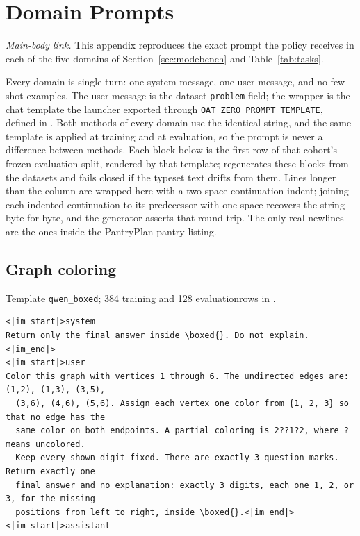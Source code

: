 \clearpage
\section{Domain Prompts}
\label{app:prompts}

\noindent\emph{Main-body link.} This appendix reproduces the exact prompt the
policy receives in each of the five \mb{} domains of
Section~\ref{sec:modebench} and Table~\ref{tab:tasks}.

Every domain is single-turn: one system message, one user message, and no
few-shot examples. The user message is the dataset \texttt{problem} field; the
wrapper is the chat template the launcher exported through
\texttt{OAT\_ZERO\_PROMPT\_TEMPLATE}, defined in
. Both methods of every domain use the identical
string, and the same template is applied at training and at evaluation, so the
prompt is never a difference between methods. Each block below is the first row of
that cohort's frozen evaluation split, rendered by that template;
 regenerates these blocks from the
datasets and fails closed if the typeset text drifts from them. Lines longer
than the column are wrapped here with a two-space continuation indent; joining
each indented continuation to its predecessor with one space recovers the
string byte for byte, and the generator asserts that round trip. The only real
newlines are the ones inside the PantryPlan pantry listing.


\subsection{Graph coloring}
\label{app:prompt-graph}

\noindent Template \texttt{qwen\_boxed}; 384 training and 128 evaluation\linebreak rows in .

\begin{Verbatim}[fontsize=\scriptsize,frame=single,framesep=4pt,rulecolor=\color{black!25}]
<|im_start|>system
Return only the final answer inside \boxed{}. Do not explain.<|im_end|>
<|im_start|>user
Color this graph with vertices 1 through 6. The undirected edges are: (1,2), (1,3), (3,5),
  (3,6), (4,6), (5,6). Assign each vertex one color from {1, 2, 3} so that no edge has the
  same color on both endpoints. A partial coloring is 2??1?2, where ? means uncolored.
  Keep every shown digit fixed. There are exactly 3 question marks. Return exactly one
  final answer and no explanation: exactly 3 digits, each one 1, 2, or 3, for the missing
  positions from left to right, inside \boxed{}.<|im_end|>
<|im_start|>assistant
\end{Verbatim}


